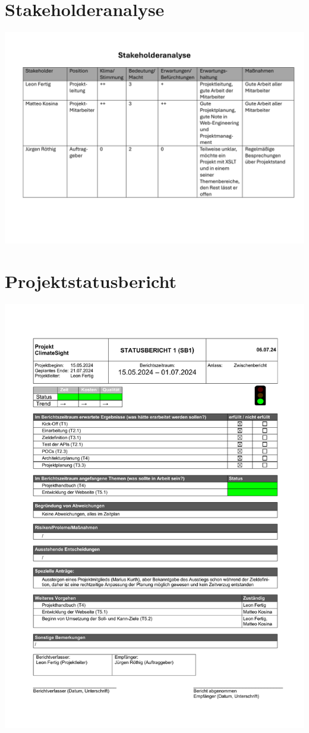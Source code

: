 \documentclass[12pt]{article}
\begin{document}
\section{Stakeholderanalyse}
\includegraphics[width=\textwidth]{Planungsdokumente/graphics/Stakeholderanalyse.pdf}

\section{Projektstatusbericht}
\includegraphics[width=\textwidth]{Planungsdokumente/graphics/Projektstatusbericht.pdf}
\end{document}
